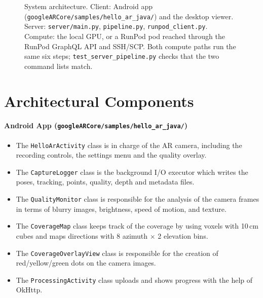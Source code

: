 \begin{figure}[htbp]
\caption{System architecture. Client: Android app (\texttt{googleARCore/samples/hello\_ar\_java/}) and the desktop viewer. Server: \texttt{server/main.py}, \texttt{pipeline.py}, \texttt{runpod\_client.py}. Compute: the local GPU, or a RunPod pod reached through the RunPod GraphQL API and SSH/SCP. Both compute paths run the same six steps; \texttt{test\_server\_pipeline.py} checks that the two command lists match.}
\label{fig:architecture}
\end{figure}

\section{Architectural Components}
\label{sec:components}

\paragraph{Android App (\texttt{googleARCore/samples/hello\_ar\_java/})}
\begin{itemize}
    \item The \texttt{HelloArActivity} class is in charge of the AR camera, including the recording controls, the settings menu and the quality overlay.
    \item The \texttt{CaptureLogger} class is the background I/O executor which writes the poses, tracking, points, quality, depth and metadata files.
    \item The \texttt{QualityMonitor} class is responsible for the analysis of the camera frames in terms of blurry images, brightness, speed of motion, and texture.
    \item The \texttt{CoverageMap} class keeps track of the coverage by using voxels with 10\,cm cubes and maps directions with 8 azimuth $\times$ 2 elevation bins.
    \item The \texttt{CoverageOverlayView} class is responsible for the creation of red/yellow/green dots on the camera images.
    \item The \texttt{ProcessingActivity} class uploads and shows progress with the help of OkHttp.
\end{itemize}

